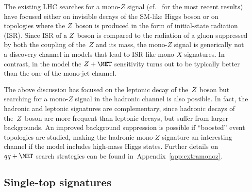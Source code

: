 The existing LHC searches for a mono-$Z$ signal (cf.~\cite{Aaboud:2017bja,Sirunyan:2017qfc} for the most recent results) have  focused either on invisible decays of the SM-like Higgs boson or on topologies where the $Z$~boson is produced in the form of initial-state radiation (ISR). Since ISR of a $Z$~boson is compared to the radiation of a gluon suppressed by both the coupling of the~$Z$ and its mass, the mono-$Z$ signal is generically not a discovery channel in models that lead to ISR-like mono-$X$ signatures. In contrast, in the \hdma model the $Z+\MET$ sensitivity  turns out to be typically better than the one of the mono-jet channel. 

The above discussion has focused on the leptonic decay of the~$Z$~boson but searching for a mono-$Z$ signal in the hadronic channel is also possible. In fact, the hadronic and leptonic signatures  are complementary, since hadronic decays of the~$Z$~boson are more frequent than leptonic decays, but suffer from larger backgrounds. An improved background suppression is possible if ``boosted'' event topologies are studied, making the hadronic mono-$Z$ signature an interesting channel if the \hdma model includes high-mass Higgs states. Further details on $q \bar q + \MET$ search strategies can be found in~Appendix~\ref{app:extramonoz}.

\subsection*{Single-top signatures}

